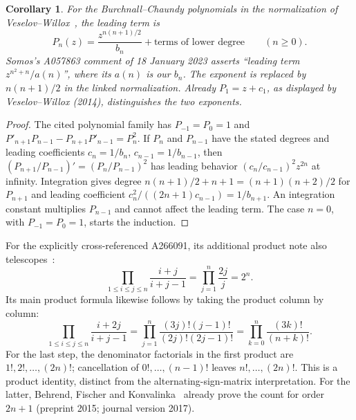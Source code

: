 \documentclass[11pt]{article}
\newtheorem{corollary}[theorem]{Corollary}
\begin{document}
\begin{corollary}\label{cor:bc}
For the Burchnall--Chaundy polynomials in the normalization of
Veselov--Willox~\cite[equation (1)]{vw}, the leading term is
\[
 P_n(z)=\frac{z^{n(n+1)/2}}{b_n}+
 \text{terms of lower degree}\qquad(n\ge0).
\]
Somos's A057863 comment of 18 January 2023 asserts
``leading term $z^{n^2+n}/a(n)$'', where its $a(n)$ is our $b_n$.
The exponent is replaced by $n(n+1)/2$ in the linked normalization.
Already $P_1=z+c_1$,
as displayed by Veselov--Willox (2014), distinguishes the two exponents.
\end{corollary}
\begin{proof}
The cited polynomial family has $P_{-1}=P_0=1$ and
$P'_{n+1}P_{n-1}-P_{n+1}P'_{n-1}=P_n^2$.
If $P_n$ and $P_{n-1}$ have the stated degrees and leading coefficients
$c_n=1/b_n$, $c_{n-1}=1/b_{n-1}$, then
$(P_{n+1}/P_{n-1})'=(P_n/P_{n-1})^2$
has leading behavior $(c_n/c_{n-1})^2z^{2n}$ at infinity.
Integration gives degree $n(n+1)/2+n+1=(n+1)(n+2)/2$ for $P_{n+1}$
and leading coefficient $c_n^2/((2n+1)c_{n-1})=1/b_{n+1}$.
An integration constant multiplies $P_{n-1}$ and cannot affect the
leading term. The case $n=0$, with $P_{-1}=P_0=1$, starts the induction.
\end{proof}

For the explicitly cross-referenced A266091, its additional product note
also telescopes~\cite{dasasm}:
\[
 \prod_{1\le i\le j\le n}\frac{i+j}{i+j-1}
 =\prod_{j=1}^n\frac{2j}{j}=2^n.
\]
Its main product formula likewise follows by taking the product column by
column:
\[
 \prod_{1\le i\le j\le n}\frac{i+2j}{i+j-1}
 =\prod_{j=1}^n\frac{(3j)!(j-1)!}{(2j)!(2j-1)!}
 =\prod_{k=0}^n\frac{(3k)!}{(n+k)!}.
\]
For the last step, the denominator factorials in the first product are
$1!,2!,\ldots,(2n)!$; cancellation of $0!,\ldots,(n-1)!$
leaves $n!,\ldots,(2n)!$. This is a product identity, distinct from the
alternating-sign-matrix interpretation. For the latter,
Behrend, Fischer and Konvalinka~\cite[Corollary 5, equation (34)]{bfk}
already prove the count for order $2n+1$ (preprint 2015; journal version 2017).

\clearpage
\end{document}
